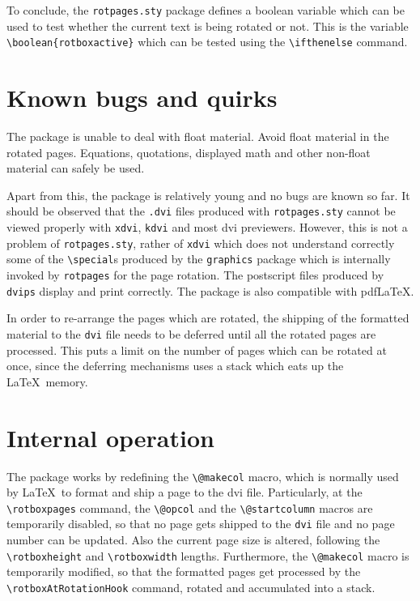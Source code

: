 \documentclass[12pt,twocolumn]{article}
\begin{document}
To conclude, the \texttt{rotpages.sty} package defines a boolean
variable which can be used to test whether the current text is being
rotated or not. This is the variable \verb|\boolean{rotboxactive}|
which can be tested using the \verb|\ifthenelse| command.


\section{Known bugs and quirks}
The package is unable to deal with float material. Avoid float
material in the rotated pages. Equations, quotations, displayed math
and other non-float material can safely be used.

Apart from this, the package is relatively young and no bugs are known
so far.  It should be observed that the \texttt{.dvi} files produced
with \texttt{rotpages.sty} cannot be viewed properly with
\texttt{xdvi}, \texttt{kdvi} and most dvi previewers. However, this is
not a problem of \texttt{rotpages.sty}, rather of \texttt{xdvi} which
does not understand correctly some of the \verb|\special|s produced by
the \texttt{graphics} package which is internally invoked by
\texttt{rotpages} for the page rotation. The postscript files produced
by \texttt{dvips} display and print correctly. The package is also
compatible with pdf\LaTeX.

In order to re-arrange the pages which are rotated, the shipping of
the formatted material to the \texttt{dvi} file needs to be deferred
until all the rotated pages are processed. This puts a limit on the
number of pages which can be rotated at once, since the deferring
mechanisms uses a stack which eats up the \LaTeX\ memory. 

\section{Internal operation}
The package works by redefining the \verb|\@makecol| macro, which is
normally used by \LaTeX\ to format and ship a page to the dvi file.
Particularly, at the \verb|\rotboxpages| command, the \verb|\@opcol|
and the \verb|\@startcolumn| macros are temporarily disabled, so that
no page gets shipped to the \texttt{dvi} file and no page number can
be updated. Also the current page size is altered, following the
\verb|\rotboxheight| and \verb|\rotboxwidth| lengths. Furthermore, the
\verb|\@makecol| macro is temporarily modified, so that the formatted
pages get processed by the \verb|\rotboxAtRotationHook| command,
rotated and accumulated into a stack.
\end{document}
